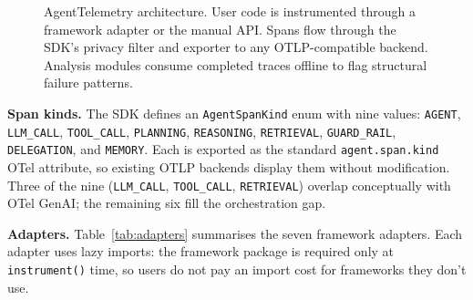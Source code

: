 \documentclass[10pt,conference]{IEEEtran}
\begin{document}
\begin{figure}[t]
\centering
\setlength{\fboxsep}{0pt}\setlength{\fboxrule}{0.4pt}
\caption{AgentTelemetry architecture. User code is instrumented
through a framework adapter or the manual API. Spans flow through
the SDK's privacy filter and exporter to any OTLP-compatible
backend. Analysis modules consume completed traces offline to
flag structural failure patterns.}
\label{fig:arch}
\end{figure}

\textbf{Span kinds.} The SDK defines an
\texttt{AgentSpanKind} enum with nine values:
\texttt{AGENT}, \texttt{LLM\_CALL}, \texttt{TOOL\_CALL},
\texttt{PLANNING}, \texttt{REASONING}, \texttt{RETRIEVAL},
\texttt{GUARD\_RAIL}, \texttt{DELEGATION}, and \texttt{MEMORY}.
Each is exported as the standard
\texttt{agent.span.kind} OTel attribute, so existing OTLP backends
display them without modification. Three of the nine
(\texttt{LLM\_CALL}, \texttt{TOOL\_CALL}, \texttt{RETRIEVAL})
overlap conceptually with OTel GenAI; the remaining six fill the
orchestration gap.

\textbf{Adapters.} Table~\ref{tab:adapters} summarises the seven
framework adapters. Each adapter uses lazy imports: the framework
package is required only at \texttt{instrument()} time, so users do
not pay an import cost for frameworks they don't use.
\end{document}
